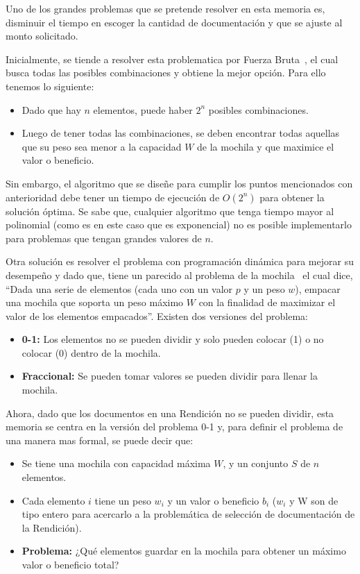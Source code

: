 Uno de los grandes problemas que se pretende resolver en esta memoria es, disminuir el tiempo en escoger la cantidad de documentación y que se ajuste al monto solicitado.

Inicialmente, se tiende a resolver esta problematica por Fuerza Bruta~\cite{22}, el cual busca todas las posibles combinaciones y obtiene la mejor opción. Para ello tenemos lo siguiente:

\begin{itemize}
    \item Dado que hay $n$ elementos, puede haber $2^n$ posibles combinaciones.
    \item Luego de tener todas las combinaciones, se deben encontrar todas aquellas que su peso sea menor a la capacidad $W$ de la mochila y que maximice el valor o beneficio.
\end{itemize}

Sin embargo, el algoritmo que se diseñe para cumplir los puntos mencionados con anterioridad debe tener un tiempo de ejecución de $O(2^n)$ para obtener la solución óptima. Se sabe que, cualquier algoritmo que tenga tiempo mayor al polinomial (como es en este caso que es exponencial) no es posible implementarlo para problemas que tengan grandes valores de $n$.

Otra solución es resolver el problema con programación dinámica para mejorar su desempeño y dado que, tiene un parecido al problema de la mochila~\cite{22} el cual dice, “Dada una serie de elementos (cada uno con un valor $p$ y un peso $w$), empacar una mochila que soporta un peso máximo $W$ con la finalidad de maximizar el valor de los elementos empacados”. Existen dos versiones del problema:

\begin{itemize}
    \item \textbf{0-1:} Los elementos no se pueden dividir y solo pueden colocar (1) o no colocar (0) dentro de la mochila.
    \item \textbf{Fraccional:} Se pueden tomar valores se pueden dividir para llenar la mochila.
\end{itemize}

Ahora, dado que los documentos en una Rendición no se pueden dividir, esta memoria se centra en la versión del problema 0-1 y, para definir el problema de una manera mas formal, se puede decir que:

\begin{itemize}
    \item Se tiene una mochila con capacidad máxima $W$, y un conjunto $S$ de $n$ elementos.
    \item Cada elemento $i$ tiene un peso $w_i$ y un valor o beneficio $b_i$ ($w_i$ y W son de tipo entero para acercarlo a la problemática de selección de documentación de la Rendición).
    \item \textbf{Problema:} ¿Qué elementos guardar en la mochila para obtener un máximo valor o beneficio total?
\end{itemize}

